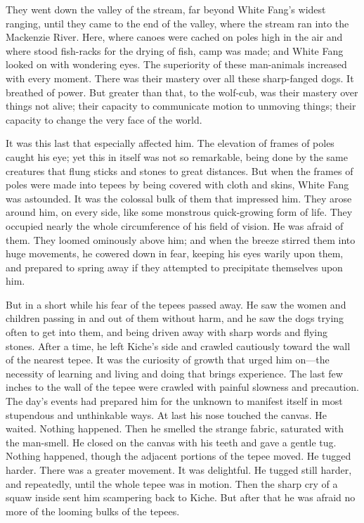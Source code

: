 \documentclass[10pt]{book}
\begin{document}
They went down the valley of the stream, far beyond White Fang’s widest
ranging, until they came to the end of the valley, where the stream ran
into the Mackenzie River. Here, where canoes were cached on poles high
in the air and where stood fish-racks for the drying of fish, camp was
made; and White Fang looked on with wondering eyes. The superiority of
these man-animals increased with every moment. There was their mastery
over all these sharp-fanged dogs. It breathed of power. But greater
than that, to the wolf-cub, was their mastery over things not alive;
their capacity to communicate motion to unmoving things; their capacity
to change the very face of the world.

It was this last that especially affected him. The elevation of frames
of poles caught his eye; yet this in itself was not so remarkable,
being done by the same creatures that flung sticks and stones to great
distances. But when the frames of poles were made into tepees by being
covered with cloth and skins, White Fang was astounded. It was the
colossal bulk of them that impressed him. They arose around him, on
every side, like some monstrous quick-growing form of life. They
occupied nearly the whole circumference of his field of vision. He was
afraid of them. They loomed ominously above him; and when the breeze
stirred them into huge movements, he cowered down in fear, keeping his
eyes warily upon them, and prepared to spring away if they attempted to
precipitate themselves upon him.

But in a short while his fear of the tepees passed away. He saw the
women and children passing in and out of them without harm, and he saw
the dogs trying often to get into them, and being driven away with
sharp words and flying stones. After a time, he left Kiche’s side and
crawled cautiously toward the wall of the nearest tepee. It was the
curiosity of growth that urged him on—the necessity of learning and
living and doing that brings experience. The last few inches to the
wall of the tepee were crawled with painful slowness and precaution.
The day’s events had prepared him for the unknown to manifest itself in
most stupendous and unthinkable ways. At last his nose touched the
canvas. He waited. Nothing happened. Then he smelled the strange
fabric, saturated with the man-smell. He closed on the canvas with his
teeth and gave a gentle tug. Nothing happened, though the adjacent
portions of the tepee moved. He tugged harder. There was a greater
movement. It was delightful. He tugged still harder, and repeatedly,
until the whole tepee was in motion. Then the sharp cry of a squaw
inside sent him scampering back to Kiche. But after that he was afraid
no more of the looming bulks of the tepees.
\end{document}
